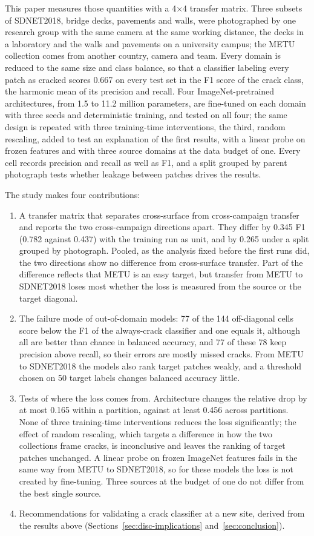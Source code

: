 \documentclass[pdflatex,sn-apa]{sn-jnl}
\begin{document}
This paper measures those quantities with a 4$\times$4 transfer matrix. Three subsets of SDNET2018, bridge decks, pavements and walls, were photographed by one research group with the same camera at the same working distance, the decks in a laboratory and the walls and pavements on a university campus; the METU collection comes from another country, camera and team. Every domain is reduced to the same size and class balance, so that a classifier labeling every patch as cracked scores 0.667 on every test set in the F1 score of the crack class, the harmonic mean of its precision and recall. Four ImageNet-pretrained architectures, from 1.5 to 11.2 million parameters, are fine-tuned on each domain with three seeds and deterministic training, and tested on all four; the same design is repeated with three training-time interventions, the third, random rescaling, added to test an explanation of the first results, with a linear probe on frozen features and with three source domains at the data budget of one. Every cell records precision and recall as well as F1, and a split grouped by parent photograph tests whether leakage between patches drives the results.

The study makes four contributions:
\begin{enumerate}
\item A transfer matrix that separates cross-surface from cross-campaign transfer and reports the two cross-campaign directions apart. They differ by 0.345 F1 (0.782 against 0.437) with the training run as unit, and by 0.265 under a split grouped by photograph. Pooled, as the analysis fixed before the first runs did, the two directions show no difference from cross-surface transfer. Part of the difference reflects that METU is an easy target, but transfer from METU to SDNET2018 loses most whether the loss is measured from the source or the target diagonal.
\item The failure mode of out-of-domain models: 77 of the 144 off-diagonal cells score below the F1 of the always-crack classifier and one equals it, although all are better than chance in balanced accuracy, and 77 of these 78 keep precision above recall, so their errors are mostly missed cracks. From METU to SDNET2018 the models also rank target patches weakly, and a threshold chosen on 50 target labels changes balanced accuracy little.
\item Tests of where the loss comes from. Architecture changes the relative drop by at most 0.165 within a partition, against at least 0.456 across partitions. None of three training-time interventions reduces the loss significantly; the effect of random rescaling, which targets a difference in how the two collections frame cracks, is inconclusive and leaves the ranking of target patches unchanged. A linear probe on frozen ImageNet features fails in the same way from METU to SDNET2018, so for these models the loss is not created by fine-tuning. Three sources at the budget of one do not differ from the best single source.
\item Recommendations for validating a crack classifier at a new site, derived from the results above (Sections~\ref{sec:disc-implications} and~\ref{sec:conclusion}).
\end{enumerate}
\end{document}
